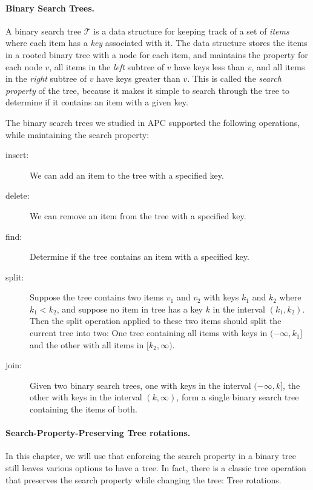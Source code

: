 \paragraph{Binary Search Trees.} A binary search tree $\mathcal{T}$ is a data structure for keeping track of a set of \emph{items} where each item has a \emph{key} associated with it.
The data structure stores the items in a rooted binary tree with a node for each item, and maintains the property for each node $v$, all items in the \emph{left} subtree of $v$ have keys less than $v$, and all items in the \emph{right} subtree of $v$ have keys greater than $v$.
This is called the \emph{search property} of the tree, because it makes it simple to search through the tree to determine if it contains an item with a given key.

The binary search trees we studied in APC supported the following operations, while maintaining the search property:
\begin{description}
\item[insert:] We can add an item to the tree with a specified key.
\item[delete:] We can remove an item from the tree with a specified key.
\item[find:] Determine if the tree contains an item with a specified key.
\item[split:] Suppose the tree contains two items $v_1$ and $v_2$ with keys $k_1$ and $k_2$ where $k_1 < k_2$, and suppose no item in tree has a key $k$ in the interval $(k_1,k_2)$. Then the split operation applied to these two items should split the current tree into two: One tree containing all items with keys in $(-\infty,k_1]$ and the other with all items in $[k_2,\infty)$.
\item[join:] Given two binary search trees, one with keys in the interval $(-\infty,k]$, the other with keys in the interval $(k,\infty)$, form a single binary search tree containing the items of both.
\end{description}

\paragraph{Search-Property-Preserving Tree rotations.} In this chapter, we will use that enforcing the search property in a binary tree still leaves various options to have a tree. In fact, there is a classic tree operation that preserves the search property while changing the tree: Tree rotations. 

